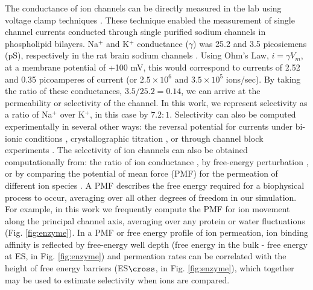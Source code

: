 \begin{refsection}
The conductance of ion channels can be directly measured in the lab using voltage clamp techniques \cite{Hille:2001tw,Sakmann:1984cc}. These technique enabled the measurement of single channel currents conducted through single purified sodium channels in phospholipid bilayers. Na$^+$ and K$^+$ conductance ($\gamma$) was 25.2 and 3.5 picosiemens (pS), respectively in the rat brain sodium channels \cite{Hartshorne:1985tk}. Using Ohm's Law, $i=\gamma V_m$, at a membrane potential of +100 mV, this would correspond to currents of 2.52 and 0.35 picoamperes of current (or $2.5 \times 10^6$ and $3.5 \times 10^5$ ions/sec). By taking the ratio of these conductances, $3.5/25.2=0.14$, we can arrive at the permeability or selectivity of the channel. In this work, we represent selectivity as a ratio of Na$^+$ over K$^+$, in this case by $7.2:1$. Selectivity can also be computed experimentally in several other ways: the reversal potential for currents under bi-ionic conditions \cite{Hille:2001tw}, crystallographic titration \cite{Sauer:2013gk,Alam:2009bu,Liu:2013hf}, or through channel block experiments \cite{Neyton:1988wj,Neyton:1988vv,Nimigean:2002fp}. The selectivity of ion channels can also be obtained computationally from: the ratio of ion conductance \cite{Sotomayor:2007ej,Kutzner:2011fz}, by free-energy perturbation \cite{Kim:2011eg,Noskov:2004tv}, or by comparing the potential of mean force (PMF) for the permeation of different ion species \cite{Nimigean:2011ww,Roux:2011ed}. A PMF describes the free energy required for a biophysical process to occur, averaging over all other degrees of freedom in our simulation. For example, in this work we frequently compute the PMF for ion movement along the principal channel axis, averaging over any protein or water fluctuations (Fig. \ref{fig:enzyme}). In a PMF or free energy profile of ion permeation, ion binding affinity is reflected by free-energy well depth (free energy in the bulk - free energy at ES, in Fig. \ref{fig:enzyme}) and permeation rates can be correlated with the height of free energy barriers (ES$\cross$, in Fig. \ref{fig:enzyme}), which together may be used to estimate selectivity when ions are compared. 


\end{refsection}
